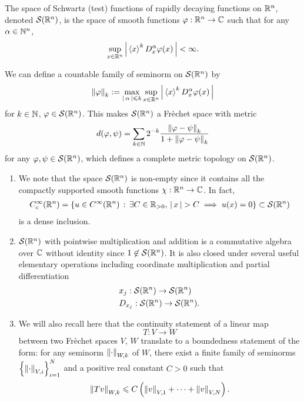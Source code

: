 \documentclass[12pt]{article}
\begin{document}
\begin{fdefinition}
    The space of Schwartz (test) functions of rapidly decaying functions on $\R^n$, denoted $\sch(\R^n)$, is the space of smooth functions $\varphi : \R^n \to \C$ such that for any $\alpha \in \N^n$, 
    \begin{align*}
    \sup_{x \in \R^n} \abs{\sym[x]^k D^\alpha_x \varphi(x)} < \infty. 
    \end{align*}

    
    We can define a countable family of seminorm on $\sch(\R^n)$ by 
    \begin{align}
    \norm[\varphi]_k := \max_{\abs{\alpha} \leq k} \sup_{x \in \R^n} \abs{\sym[x]^k D^\alpha_x \varphi(x)} \label{eq : schwartz seminorm} 
    \end{align}
    for $k \in \N$, $\varphi \in \sch(\R^n)$. This makes $\sch(\R^n)$ a Fr\`echet space with metric 
    \begin{align*}
    d(\varphi, \psi) = \sum_{k \in \N} 2^{-k} \frac{\norm[\varphi - \psi]_k}{1 + \norm[\varphi - \psi]_k} 
    \end{align*}
    for any $\varphi, \psi \in \sch(\R^n)$, which defines a complete metric topology on $\sch(\R^n)$. 
\end{fdefinition}
\begin{rem} \hfill 
    \begin{enumerate}
        \item     We note that the space $\sch(\R^n)$ is non-empty since it contains all the compactly supported smooth functions $\chi : \R^n \to \C$. In fact, 
        \begin{align*}
        C^\infty_c(\R^n) = \set{u \in C^\infty(\R^n) \wh \exists C \in \R_{> 0}, \, \abs{x} > C \implies u(x) = 0} \subset \sch(\R^n)
        \end{align*}
        is a dense inclusion. 
        
        \item $\sch(\R^n)$ with pointwise multiplication and addition is a commutative algebra over $\C$ without identity since $1 \not\in \sch(\R^n)$. It is also closed under several useful elementary operations including coordinate multiplication and partial differentiation
        \begin{align*}
        &x_j : \sch(\R^n) \to \sch(\R^n) \\
        &D_{x_j} : \sch(\R^n) \to \sch(\R^n). 
        \end{align*}
        
        \item We will also recall here that the continuity statement of a linear map $$T: V \to W$$  between two Fr\`echet spaces $V$, $W$ translate to a boundedness statement of the form: for any seminorm $\norm_{W, k}$ of $W$, there exist a finite family of seminorms $\set{\norm_{V, i}}_{i = 1}^N$ and a positive real constant $C > 0$ such that
        \begin{align}
        \norm[Tv]_{W, k} \leq C \brac{\norm[v]_{V, 1} + \dots + \norm[v]_{V, N}}. \label{eq: Frechet space continuity}
        \end{align}
    \end{enumerate}
\end{rem}
\end{document}
